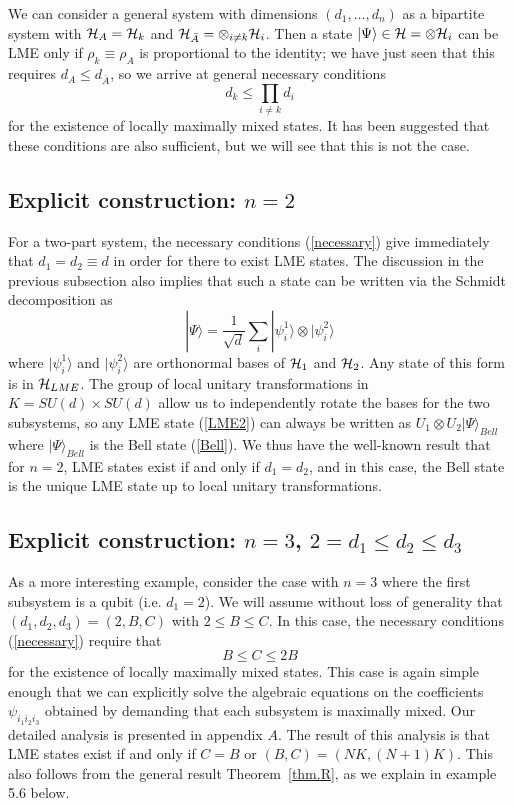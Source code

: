 \documentclass[12pt]{article}
\theoremstyle{definition}
\newcommand{\be}{\begin{equation}}
\newcommand{\ee}{\end{equation}}
\begin{document}
We can consider a general system with dimensions $(d_1,\dots, d_n)$ as a bipartite system with ${\cal H}_A = {\cal H}_k$ and ${\cal H}_{\bar{A}} =  \otimes_{i \ne k} {\cal H}_i$. Then a state $|\Psi \rangle \in {\cal H} =  \otimes {\cal H}_i$ can be LME only if $\rho_k \equiv \rho_A$ is proportional to the identity; we have just seen that this requires $d_A \le d_{\bar{A}}$, so we arrive at general necessary conditions
\be
\label{necessary}
d_k \le \prod_{i \ne k} d_i
\ee
for the existence of locally maximally mixed states. It has been suggested that these conditions are also sufficient, but we will see that this is not the case.

\subsection{Explicit construction: $n=2$}

For a two-part system, the necessary conditions (\ref{necessary}) give
immediately that $d_1 = d_2 \equiv d$ in order for there to exist LME
states. The discussion in the previous subsection also implies that
such a state can be written via the Schmidt decomposition as
\be
\label{LME2} |\Psi \rangle = \frac{1}{\sqrt{d}} \sum_i |\psi_i^1
\rangle  \otimes |\psi_i^2 \rangle \ee
where $|\psi_i^1 \rangle$ and
$|\psi_i^2 \rangle$ are orthonormal bases of ${\cal H}_1$ and ${\cal
H}_2$. Any state of this form is in ${\cal H}_{LME}$. The group of
local unitary transformations in $K = SU(d) \times SU(d)$ allow us to
independently rotate the bases for the two subsystems, so any LME
state (\ref{LME2}) can always be written as $U_1  \otimes U_2 |\Psi
\rangle_{Bell}$ where $|\Psi \rangle_{Bell}$ is the Bell state
(\ref{Bell}). We thus have the well-known result that for $n=2$, LME
states exist if and only if $d_1 = d_2$, and in this case, the Bell
state is the unique LME state up to local unitary transformations.

\subsection{Explicit construction: $n=3$, $2 = d_1 \le d_2 \le d_3$}\label{sec:Explicit23}

As a more interesting example, consider the case with $n=3$ where the
first subsystem is a qubit (i.e. $d_1 = 2$). We will assume without
loss of generality that $(d_1, d_2, d_3) = (2,B,C)$ with $2 \le B \le
C$. In this case, the necessary conditions (\ref{necessary}) require
that \be B \le C \le 2 B \ee for the existence of locally maximally
mixed states. This case is again simple enough that we can explicitly
solve the algebraic equations on the coefficients $\psi_{i_1 i_2 i_3}$
obtained by demanding that each subsystem is maximally mixed. Our
detailed analysis is presented in appendix $A$. The result of this
analysis is that LME states exist if and only if $C=B$ or $(B,C) =
(NK,(N+1)K)$. This also follows from the general result Theorem~\ref{thm.R}, as we explain in example 5.6 below.
\end{document}

